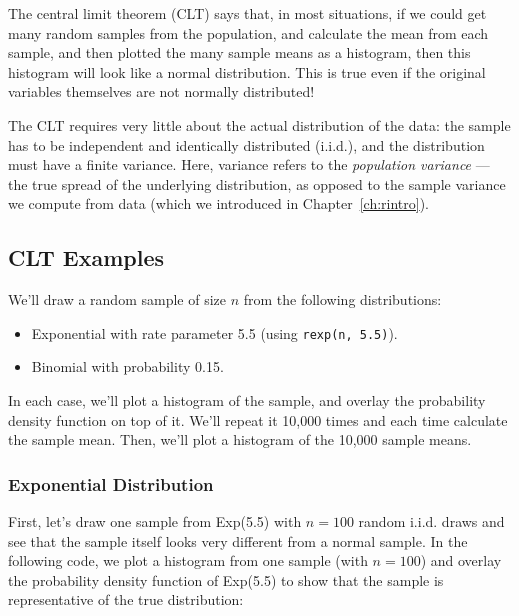 The central limit theorem (CLT) says that, in most situations, if we could get
many random samples from the population, and calculate the mean from each
sample, and then plotted the many sample means as a histogram, then this
histogram will look like a normal distribution. This is true even if the
original variables themselves are not normally distributed!

The CLT requires very little about the actual distribution of the data: the
sample has to be independent and identically distributed (i.i.d.), and the
distribution must have a finite variance. Here, variance refers to the
\emph{population variance} --- the true spread of the underlying distribution,
as opposed to the sample variance we compute from data (which we introduced
in Chapter~\ref{ch:rintro}).

\subsection{CLT Examples}
We'll draw a random sample of size $n$ from the following distributions:
\begin{itemize}
\item Exponential with rate parameter 5.5 (using \lstinline{rexp(n, 5.5)}).
\item Binomial with probability 0.15.
\end{itemize}

In each case, we'll plot a histogram of the sample, and overlay the
probability density function on top of it.  We'll repeat it 10,000 times and
each time calculate the sample mean. Then, we'll plot a histogram of the
10,000 sample means.

\subsubsection{Exponential Distribution}
First, let's draw one sample from Exp(5.5) with $n=100$ random i.i.d. draws
and see that the sample itself looks very different from a normal sample. In
the following code, we plot a histogram from one sample (with $n=100$) and
overlay the probability density function of Exp(5.5) to show that the sample
is representative of the true distribution:

